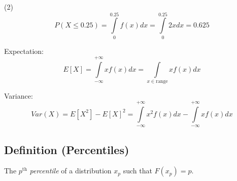 (2)
\[  P(X\le 0.25)=
\int\limits_{0}^{0.25} f(x) d{x} =\int\limits_{0}^{0.25} 2x d{x} =0.625 \]

\begin{defbox}
    Expectation:
    \[ E[X]=\int\limits_{-\infty}^{+\infty} x f
(x) d{x} =
    \int\limits_{x\in\text{range}}^{} x f
(x) d{x}  \]
\end{defbox}

\begin{defbox}
    Variance:
    \[ Var(X)=E[X^2]-E[X]^2=\int\limits_{-\infty}^{+\infty} x^2f(x) d{x}-
    \int\limits_{-\infty}^{+\infty} x f
(x) d{x} \]
\end{defbox}

\begin{defbox}
    \subsection{Definition (Percentiles)}
    The $ p^\text{th} $ \emph{percentile} of a distribution $ x_p $ such that
    $ F(x_p)=p $.
\end{defbox}
